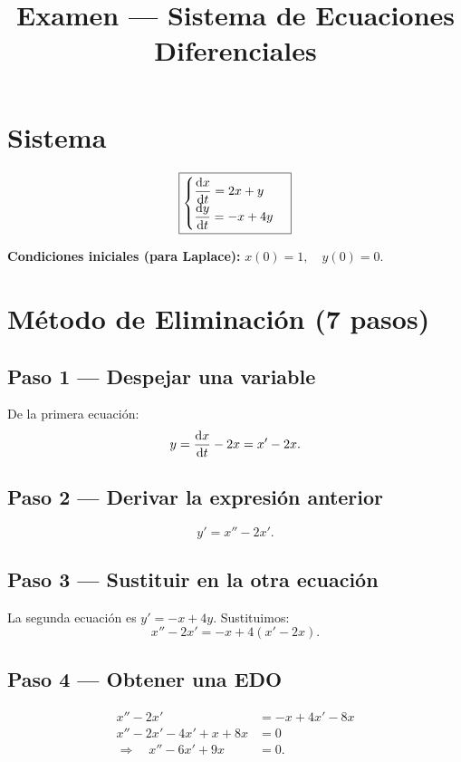 \documentclass[10pt,a4paper]{article}
\title{\textbf{Examen --- Sistema de Ecuaciones Diferenciales}}
\author{}
\date{}
\begin{document}
\maketitle

\section{Sistema}

\[
\boxed{
\begin{cases}
\displaystyle \dv{x}{t} = 2x + y \\[2pt]
\displaystyle \dv{y}{t} = -x + 4y
\end{cases}
}
\]

\noindent\textbf{Condiciones iniciales (para Laplace):}\qquad
\(x(0) = 1,\quad y(0) = 0\).

\section{Método de Eliminación (7 pasos)}

\subsection{Paso 1 --- Despejar una variable}

De la primera ecuación:
\[
y = \dv{x}{t} - 2x = x' - 2x.
\]

\subsection{Paso 2 --- Derivar la expresión anterior}
\[
y' = x'' - 2x'.
\]

\subsection{Paso 3 --- Sustituir en la otra ecuación}

La segunda ecuación es \(y' = -x + 4y\). Sustituimos:
\[
x'' - 2x' = -x + 4(x' - 2x).
\]

\subsection{Paso 4 --- Obtener una EDO}
\[
\begin{aligned}
x'' - 2x' &= -x + 4x' - 8x \\
x'' - 2x' - 4x' + x + 8x &= 0 \\
\Rightarrow\quad x'' - 6x' + 9x &= 0.
\end{aligned}
\]
\end{document}
